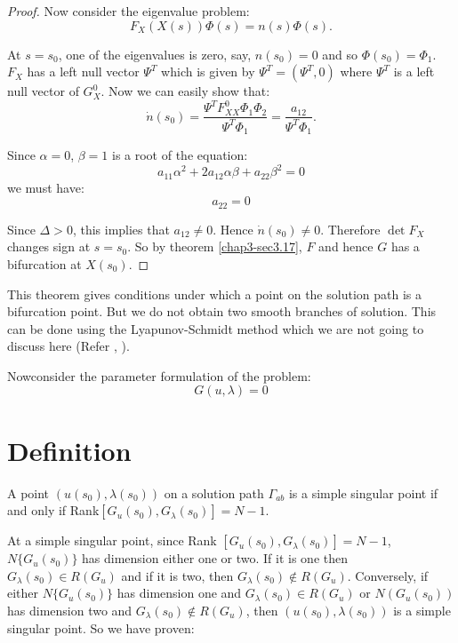 \begin{proof}
Now consider the eigenvalue problem:
$$
F_X(X(s)) \Phi (s)= n(s) \Phi (s).
$$

At $s=s_0$, one of the eigenvalues is zero, say, $n(s_0)=0$ and so
$\Phi(s_0)=\Phi_1$. $F_X$ has a left null vector $\Psi^T$ which is
given by $\Psi^T=(\Psi^T, 0)$ where $\Psi^T$ is a left null vector of
$G^0_X$. Now we can easily show that: 
$$
\dot{n} (s_0)= \frac{\Psi^T F^0_{XX} \Phi_1 \Phi_2}{\Psi^T \Phi_1}=
\frac{a_{12}}{\Psi^T \Phi_1}. 
$$

Since $\alpha = 0$, $\beta=1$ is a root of the equation:
$$
a_{11}\alpha^2 + 2a_{12} \alpha \beta + a_{22} \beta^2 =0 
$$
we must have:
$$
a_{22}=0
$$

Since $\Delta > 0$, this implies that $a_{12} \neq 0$. Hence
$\dot{n}(s_0)\neq 0$. Therefore $\det F_X$ changes sign at $s=s_0$. So
by theorem \ref{chap3-sec3.17}, $F$ and hence $G$ has a bifurcation at
$X(s_0)$.  
\end{proof}

\begin{note*}
This theorem gives conditions under which a point on the solution path
is a bifurcation point. But we do not obtain two smooth branches of
solution. This can be done using the Lyapunov-Schmidt method which we
are not going to discuss here (Refer \cite{key4}, \cite{key26}). 
\end{note*}

Now\pageoriginale consider the parameter formulation of the problem:
\begin{equation*}
G(u,\lambda)=0 \tag{5.9}\label{chap5-eq5.9}
\end{equation*}

\setcounter{section}{9}
\section{Definition}\label{chap5-sec5.10}%

A point $(u(s_0), \lambda(s_0))$ on a solution path $\Gamma_{ab}$ is a
simple singular point if and only if Rank$[G_u(s_0), G_\lambda
  (s_0)]=N-1$. 

At a simple singular point, since Rank $[G_u(s_0), G_\lambda
  (s_0)]=N-1$, $N\{G_u(s_0)\}$ has dimension either one or two. If it
is one then $G_\lambda(s_0)\in R(G_u)$ and if it is two, then
$G_\lambda(s_0) \not \in R(G_u)$. Conversely, if either
$N\{G_u(s_0)\}$ has dimension one and $G_\lambda(s_0)  \in R(G_u)$ or
$N(G_u(s_0))$ has dimension two and $G_\lambda(s_0)  \not \in R(G_u)$,
then $(u(s_0),\lambda(s_0))$ is a simple singular point. So we have 
proven: 

